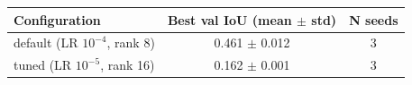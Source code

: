 \begin{tabular}{lcc}
\toprule
Configuration & Best val IoU (mean $\pm$ std) & N seeds \\
\midrule
default (LR $10^{-4}$, rank 8) & 0.461 $\pm$ 0.012 & 3 \\
tuned (LR $10^{-5}$, rank 16) & 0.162 $\pm$ 0.001 & 3 \\
\bottomrule
\end{tabular}
